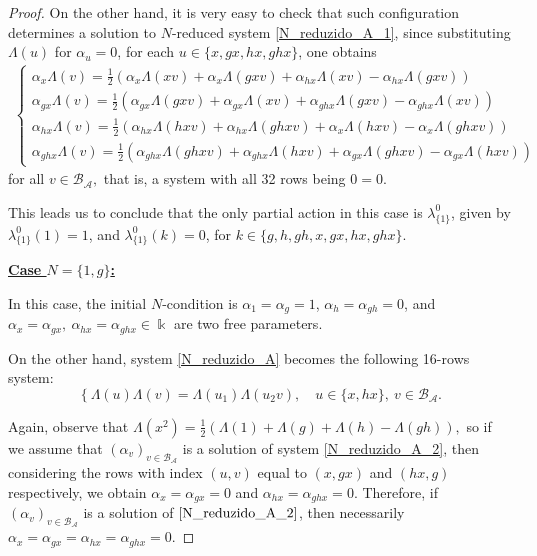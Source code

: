 \documentclass[reqno]{amsart}
\theoremstyle{definition}
\numberwithin{equation}{section}\theoremstyle{plain}
\newcommand{\B}{\mathcal{B}}
\theoremstyle{definition}
\def \A {\mathcal{A}}
\begin{document}
\begin{proof}
On the other hand, it is very easy to check that such configuration determines a solution to $N$-reduced system \eqref{N_reduzido_A_1}, since substituting $\Lambda(u)$ for $\alpha_u=0$, for each $u \in \{x, gx, hx, ghx\}$, one obtains
\begin{align*}
\left\{
\begin{array}{lll}
\alpha_{x}\Lambda(v)  = \frac{1}{2} \left(\alpha_{x}\Lambda(x v) + \alpha_{x}\Lambda(gx v) + \alpha_{hx}\Lambda(x v) - \alpha_{hx}\Lambda(gx v)\right) \\
\alpha_{gx}\Lambda(v)  = \frac{1}{2} \left(\alpha_{gx}\Lambda(gx v) + \alpha_{gx}\Lambda(x v) + \alpha_{ghx}\Lambda(gx v) - \alpha_{ghx}\Lambda(x v)\right) \\
\alpha_{hx}\Lambda(v)  = \frac{1}{2} \left(\alpha_{hx}\Lambda(hx v) + \alpha_{hx}\Lambda(ghx v) + \alpha_{x}\Lambda(hx v) - \alpha_{x}\Lambda(ghx v)\right) \\
\alpha_{ghx}\Lambda(v)  = \frac{1}{2} \left(\alpha_{ghx}\Lambda(ghx v) + \alpha_{ghx}\Lambda(hx v) + \alpha_{gx}\Lambda(ghx v) - \alpha_{gx}\Lambda(hx v)\right)
\end{array} 
\right.
\end{align*}
for all $v \in \B_\A,$
that is, a system with all 32 rows being $0=0$.

\medbreak

This leads us to conclude that the only partial action in this case is $\lambda_{\{1\}}^0$, given by $\lambda_{\{1\}}^0(1)=1$, and $\lambda_{\{1\}}^0(k)=0$, for $k \in \{g, h, gh, x, gx, hx, ghx\}.$

\medbreak

\textbf{\underline{Case $N=\{1,g\}$:}}

\smallbreak

In this case, the initial $N$-condition is $\alpha_1 = \alpha_g =1$, $\alpha_h = \alpha_{gh} = 0$, and $\alpha_x = \alpha_{gx}, \ \alpha_{hx} =  \alpha_{ghx} \in \Bbbk$ are two free parameters.

On the other hand, system \eqref{N_reduzido_A} becomes the following 16-rows system:
\begin{equation}\label{N_reduzido_A_2}
\left\{\Lambda(u)\Lambda(v) = \Lambda(u_1)\Lambda(u_2 v),
\right. \quad u \in \{x, hx\},\ v \in \B_\A.
\end{equation}

\medbreak

Again, observe that 
$\Lambda(x^2) = \tfrac{1}{2}\left(\Lambda(1)+\Lambda(g)+\Lambda(h)-\Lambda(gh)\right),$
so if we assume that $\left(\alpha_v\right)_{v \in \B_\A}$ is a solution of system \eqref{N_reduzido_A_2}, then considering the rows with index $(u,v)$ equal to $(x,gx)$ and $(hx,g)$ respectively, we obtain $\alpha_x = \alpha_{gx}=0$ and $\alpha_{hx} = \alpha_{ghx} =0$.
Therefore, if $\left(\alpha_v\right)_{v \in \B_\A}$ is a solution of $\eqref{N_reduzido_A_2}$, then necessarily
$ \alpha_{x} = \alpha_{gx} = \alpha_{hx} = \alpha_{ghx} =0.$


\end{proof}
\end{document}
